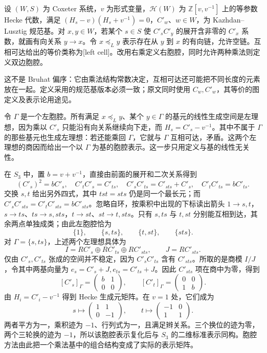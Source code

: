 \begin{definition}\label{b5:def:kl-left-cell}
	设 \((W,S)\) 为 Coxeter 系统，\(v\) 为形式变量，\(\mathcal H(W)\) 为 \(\mathbb Z[v,v^{-1}]\) 上的等参数 Hecke 代数，满足 \((H_s-v)(H_s+v^{-1})=0\)，\(C'_w\)、\(w\in W\)，为 Kazhdan--Lusztig 规范基。对 \(x,y\in W\)，若某个 \(s\in S\) 使 \(C'_sC'_y\) 的展开含非零的 \(C'_x\) 系数，就画有向关系 \(y\to x\)。令 \(x\preceq_L y\) 表示存在从 \(y\) 到 \(x\) 的有向链，允许空链。互相可达给出的等价类称为[left cell]。改用右乘定义右胞腔，同时允许两种乘法则定义双边胞腔。
\end{definition}

这不是 Bruhat 偏序：它由乘法结构常数决定，互相可达还可能把不同长度的元素放在一起。定义采用的规范基版本必须一致；原文同时使用 \(C_w,C'_w\)，其等价的图定义及表示论用途见\cite[Section 1, Definition 1.2 and Theorems 1.3--1.4, pp. 166--167]{KazhdanLusztig1979Hecke}。

\ProseParagraphBreak
令 \(\Gamma\) 是一个左胞腔。所有满足 \(x\preceq_L y\)、某个 \(y\in\Gamma\) 的基元的线性生成空间是左理想，因为乘以 \(C'_s\) 只能沿有向关系继续向下走，而 \(H_s=C'_s-v^{-1}\)。其中不属于 \(\Gamma\) 的那些基元也生成左理想：若还能乘回 \(\Gamma\)，它就与 \(\Gamma\) 互相可达，矛盾。这两个左理想的商因而给出一个以 \(\Gamma\) 为基的胞腔表示。这一步只用定义与基的线性无关性。

\ProseParagraphBreak
在 \(S_3\) 中，置 \(b=v+v^{-1}\)，直接由前面的展开和二次关系得到
\[
	(C'_s)^2=bC'_s,\quad C'_tC'_s=C'_{ts},\quad C'_sC'_{ts}=C'_{sts}+C'_s,\quad C'_tC'_{ts}=bC'_{ts}.
\]
交换 \(s,t\) 给出另外四式，其中 \(tst=sts\) 仍是同一个最长元；而 \(C'_sC'_{sts}=C'_tC'_{sts}=bC'_{sts}\)。忽略自环，按乘积中出现的下标读出箭头 \(1\to s,t\)，\(s\to ts\)、\(ts\to s,sts\)，\(t\to st\)、\(st\to t,sts\)。只有 \(s,ts\) 与 \(t,st\) 分别能互相到达，其余两点单独成类；由此左胞腔恰为
\[
	\{1\},\qquad\{s,ts\},\qquad\{t,st\},\qquad\{sts\}.
\]
对 \(\Gamma=\{s,ts\}\)，上述两个左理想具体为
\[
	I=R C'_s\oplus R C'_{ts}\oplus R C'_{sts},\qquad J=R C'_{sts}.
\]
仅由 \(C'_s,C'_{ts}\) 张成的空间并不稳定，因为 \(C'_sC'_{ts}\) 含有 \(C'_{sts}\)。所取的是商模 \(I/J\)，令其中两基向量为 \(e_s=C'_s+J,e_{ts}=C'_{ts}+J\)。因此 \(C'_{sts}\) 项在商中为零，得到
\[
	[C'_s]_\Gamma=
	\begin{pmatrix}b&1\\0&0\end{pmatrix},
	\qquad [C'_t]_\Gamma=
	\begin{pmatrix}0&0\\1&b\end{pmatrix}.
\]
由 \(H_i=C'_i-v^{-1}\) 得到 Hecke 生成元矩阵。在 \(v=1\) 处，它们成为
\[
	s\longmapsto\begin{pmatrix}1&1\\0&-1\end{pmatrix},
	\qquad
	t\longmapsto\begin{pmatrix}-1&0\\1&1\end{pmatrix}.
\]
两者平方为一，乘积迹为 \(-1\)、行列式为一，且满足辫关系。三个换位的迹为零，两个三轮换的迹为 \(-1\)，所以该胞腔表示复化后与 \(S_3\) 的二维标准表示同构。胞腔方法由此把一个乘法基中的组合结构变成了实际的表示矩阵。

